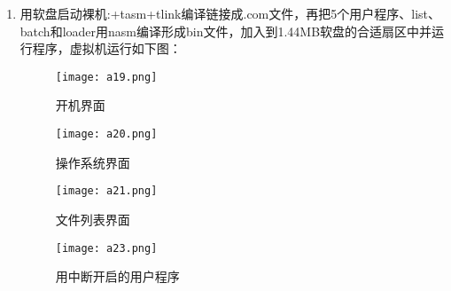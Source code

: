 \documentclass[UTF8]{article}
\begin{document}
\begin{enumerate}[1)]
  \item 用软盘启动裸机:+tasm+tlink编译链接成.com文件，再把5个用户程序、list、batch和loader用nasm编译形成bin文件，加入到1.44MB软盘的合适扇区中并运行程序，虚拟机运行如下图：
  \begin{figure}[htbp]
			\centering
			\texttt{[image: a19.png]}
			\caption{开机界面}
	\end{figure}
	 \begin{figure}[htbp]
			\centering
			\texttt{[image: a20.png]}
			\caption{操作系统界面}
		\end{figure}
		\begin{figure}[htbp]
			\centering
			\texttt{[image: a21.png]}
			\caption{文件列表界面}
		\end{figure}
		\begin{figure}[htbp]
			\centering
			\texttt{[image: a23.png]}
			\caption{用中断开启的用户程序}
		\end{figure}

	
  \end{enumerate}

\newpage
\end{document}
